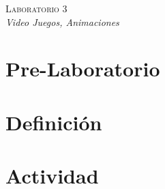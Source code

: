 \begin{center}
\textsc{\Large Laboratorio 3}~\\
\emph{\large Video Juegos, Animaciones}
\end{center}

\section{Pre-Laboratorio}

\section{Definición}

\section{Actividad}
